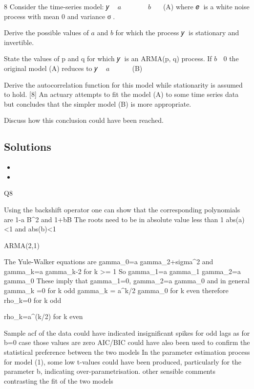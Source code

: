 


8 Consider the time-series model:
𝑦􀯧 􀵌 $a$ 𝑦􀯧􀬿􀬶 􀵅 𝑒􀯧 􀵅 $b$ 𝑒􀯧􀬿􀬵 (A)
where 𝑒􀯧 is a white noise process with mean 0 and variance σ􀬶.
\item   Derive the possible values of $a$ and $b$ for which the process 𝑦􀯧 is stationary
and invertible. 
\item   State the values of p and q for which 𝑦􀯧 is an ARMA(p, q) process. 
If $b$ 􀵌 0 the original model (A) reduces to
𝑦􀯧 􀵌 $a$ 𝑦􀯧􀬿􀬶 􀵅 𝑒􀯧 (B)
\item  Derive the autocorrelation function for this model while stationarity is
assumed to hold. [8]
An actuary attempts to fit the model (A) to some time series data but concludes that
the simpler model (B) is more appropriate.
\item  Discuss how this conclusion could have been reached. 

\subsection*{Solutions}

\begin{itemize}
\item
\item
\end{itemize}

Q8
\item  
Using the backshift operator one can show that the corresponding polynomials are
1-a B^2 
and
1+bB 
The roots need to be in absolute value less than 1
abs(a)<1 and abs(b)<1 
\item  
ARMA(2,1) 
\item 
The Yule-Walker equations are
gamma_0=a gamma_2+sigma^2 
and
gamma_k=a gamma_{k-2} for k >= 1 
So
\medskip 
gamma_1=a gamma_1 
gamma_2=a gamma_0 
These imply that
gamma_1=0, gamma_2=a gamma_0 and in general 
gamma_k =0 for k odd 
gamma_k = a^{k/2} gamma_0 for k even 
therefore
rho_k=0 for k odd \item 
rho_k=a^(k/2) for k even \item 


\item 
Sample acf of the data could have indicated insignificant spikes for odd lags as
for b=0 case those values are zero 
AIC/BIC could have also been used to confirm the statistical preference between the
two models 
In the parameter estimation process for model (1), some low t-values could have been produced, particularly for the parameter b, indicating over-parametrisation. 
other sensible comments contrasting the fit of the two models 


